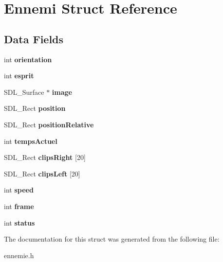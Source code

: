 \hypertarget{structEnnemi}{}\section{Ennemi Struct Reference}
\label{structEnnemi}
\subsection*{Data Fields}
\begin{DoxyCompactItemize}
\item 
\mbox{\label{structEnnemi_a263073f6a51c5f230e4dc095ada2d076}} 
int {\bfseries orientation}
\item 
\mbox{\label{structEnnemi_afdaf61dbb6cb64c0390ab1df1d304268}} 
int {\bfseries esprit}
\item 
\mbox{\label{structEnnemi_aaa6f9be660b13c562cc72213abe89c92}} 
S\+D\+L\+\_\+\+Surface $\ast$ {\bfseries image}
\item 
\mbox{\label{structEnnemi_aa31d169528ee729764721ae9f258fcd7}} 
S\+D\+L\+\_\+\+Rect {\bfseries position}
\item 
\mbox{\label{structEnnemi_a1c9518d04c63608aad25209c8cd1d30f}} 
S\+D\+L\+\_\+\+Rect {\bfseries position\+Relative}
\item 
\mbox{\label{structEnnemi_a30695691f611dc8bc64be42df6f23b40}} 
int {\bfseries temps\+Actuel}
\item 
\mbox{\label{structEnnemi_af4d9831ccfc25b1cc84ef7088affb25a}} 
S\+D\+L\+\_\+\+Rect {\bfseries clips\+Right} \mbox{[}20\mbox{]}
\item 
\mbox{\label{structEnnemi_ae479f564ce8a856160359d440b2ce2d9}} 
S\+D\+L\+\_\+\+Rect {\bfseries clips\+Left} \mbox{[}20\mbox{]}
\item 
\mbox{\label{structEnnemi_abf051ea1d034df4a8b0480e9387f2008}} 
int {\bfseries speed}
\item 
\mbox{\label{structEnnemi_a13f47ad0b570455b12eb453e18352dd3}} 
int {\bfseries frame}
\item 
\mbox{\label{structEnnemi_a9d03b2261bd09c34c8f44051edd7c164}} 
int {\bfseries status}
\end{DoxyCompactItemize}


The documentation for this struct was generated from the following file\+:\begin{DoxyCompactItemize}
\item 
ennemie.\+h\end{DoxyCompactItemize}
